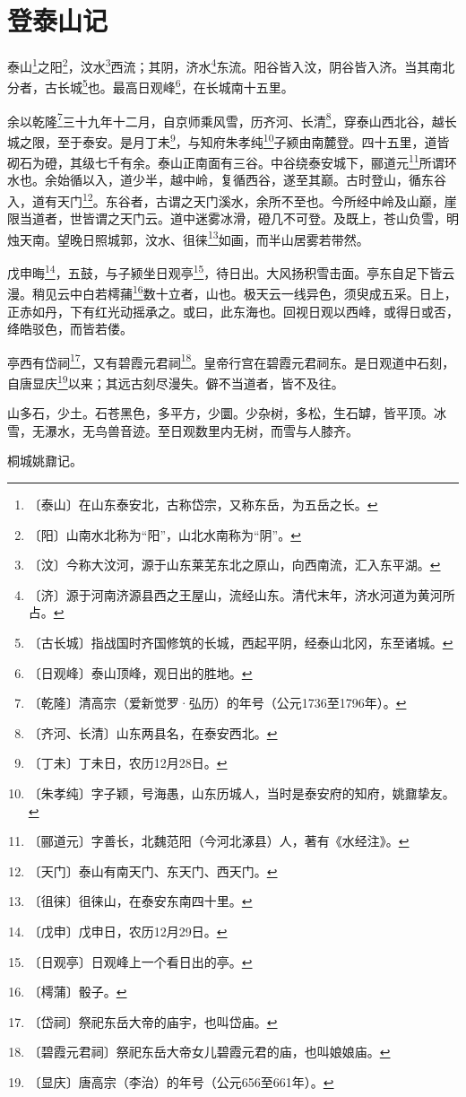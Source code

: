 \documentclass[12pt,UTF-8,openany]{ctexbook}
\begin{document}
\chapter{登泰山记}

\begin{normalsize}
    
    泰山\footnote{〔泰山〕在山东泰安北，古称岱宗，又称东岳，为五岳之长。}之阳\footnote{〔阳〕山南水北称为“阳”，山北水南称为“阴”。}，汶水\footnote{〔汶〕今称大汶河，源于山东莱芜东北之原山，向西南流，汇入东平湖。}西流；其阴，济水\footnote{〔济〕源于河南济源县西之王屋山，流经山东。清代末年，济水河道为黄河所占。}东流。阳谷皆入汶，阴谷皆入济。当其南北分者，古长城\footnote{〔古长城〕指战国时齐国修筑的长城，西起平阴，经泰山北冈，东至诸城。}也。最高日观峰\footnote{〔日观峰〕泰山顶峰，观日出的胜地。}，在长城南十五里。
    
    余以乾隆\footnote{〔乾隆〕清高宗（爱新觉罗·弘历）的年号（公元1736至1796年）。}三十九年十二月，自京师乘风雪，历齐河、长清\footnote{〔齐河、长清〕山东两县名，在泰安西北。}，穿泰山西北谷，越长城之限，至于泰安。是月丁未\footnote{〔丁未〕丁未日，农历12月28日。}，与知府朱孝纯\footnote{〔朱孝纯〕字子颖，号海愚，山东历城人，当时是泰安府的知府，姚鼐挚友。}子颍由南麓登。四十五里，道皆砌石为磴，其级七千有余。泰山正南面有三谷。中谷绕泰安城下，郦道元\footnote{〔郦道元〕字善长，北魏范阳（今河北涿县）人，著有《水经注》。}所谓环水也。余始循以入，道少半，越中岭，复循西谷，遂至其巅。古时登山，循东谷入，道有天门\footnote{〔天门〕泰山有南天门、东天门、西天门。}。东谷者，古谓之天门溪水，余所不至也。今所经中岭及山巅，崖限当道者，世皆谓之天门云。道中迷雾冰滑，磴几不可登。及既上，苍山负雪，明烛天南。望晚日照城郭，汶水、徂徕\footnote{〔徂徕〕徂徕山，在泰安东南四十里。}如画，而半山居雾若带然。
    
    戊申晦\footnote{〔戊申〕戊申日，农历12月29日。}，五鼓，与子颍坐日观亭\footnote{〔日观亭〕日观峰上一个看日出的亭。}，待日出。大风扬积雪击面。亭东自足下皆云漫。稍见云中白若樗蒱\footnote{〔樗蒲〕骰子。}数十立者，山也。极天云一线异色，须臾成五采。日上，正赤如丹，下有红光动摇承之。或曰，此东海也。回视日观以西峰，或得日或否，绛皓驳色，而皆若偻。
    
    亭西有岱祠\footnote{〔岱祠〕祭祀东岳大帝的庙宇，也叫岱庙。}，又有碧霞元君祠\footnote{〔碧霞元君祠〕祭祀东岳大帝女儿碧霞元君的庙，也叫娘娘庙。}。皇帝行宫在碧霞元君祠东。是日观道中石刻，自唐显庆\footnote{〔显庆〕唐高宗（李治）的年号（公元656至661年）。}以来；其远古刻尽漫失。僻不当道者，皆不及往。
    
    山多石，少土。石苍黑色，多平方，少圜。少杂树，多松，生石罅，皆平顶。冰雪，无瀑水，无鸟兽音迹。至日观数里内无树，而雪与人膝齐。
    
    桐城姚鼐记。
\end{normalsize}
\end{document}
